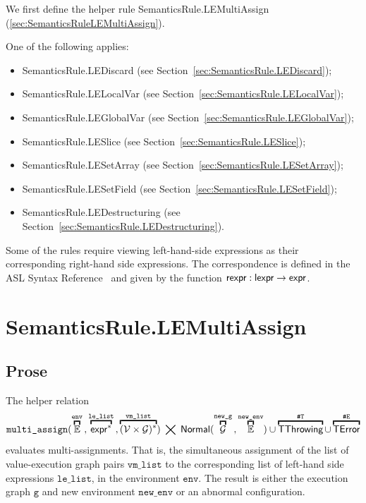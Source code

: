 \documentclass{book}
\newcommand\overname[2]{\overbracket{#1}^{#2}}
\newcommand\XGraphs[0]{\mathcal{G}}
\newcommand\vals[0]{\mathcal{V}}
\newcommand\aslrel[0]{\bigtimes}
\newcommand\aslsep[0]{\mathbf{,}}
\newcommand\ThrowingConfig[0]{\texttt{\#T}}
\newcommand\ErrorConfig[0]{\texttt{\#E}}
\newcommand\TError[0]{\textsf{TError}}
\newcommand\TThrowing[0]{\textsf{TThrowing}}
\newcommand\evalmultiassignment[1]{\texttt{multi\_assign}(#1)}
\newcommand\Normal[0]{\textsf{Normal}}
\newcommand\newenv[0]{\texttt{new\_env}}
\newcommand\env[0]{\texttt{env}}
\newcommand\vg[0]{\texttt{g}}
\newcommand\newg[0]{\texttt{new\_g}}
\newcommand\vlelist[0]{\texttt{le\_list}}
\newcommand\vmlist[0]{\texttt{vm\_list}}
\begin{document}
We first define the helper rule SemanticsRule.LEMultiAssign (\ref{sec:SemanticsRuleLEMultiAssign}).

One of the following applies:
\begin{itemize}
\item SemanticsRule.LEDiscard (see Section~\ref{sec:SemanticsRule.LEDiscard});
\item SemanticsRule.LELocalVar (see Section~\ref{sec:SemanticsRule.LELocalVar});
\item SemanticsRule.LEGlobalVar (see Section~\ref{sec:SemanticsRule.LEGlobalVar});
\item SemanticsRule.LESlice (see Section~\ref{sec:SemanticsRule.LESlice});
\item SemanticsRule.LESetArray (see Section~\ref{sec:SemanticsRule.LESetArray});
\item SemanticsRule.LESetField (see Section~\ref{sec:SemanticsRule.LESetField});
\item SemanticsRule.LEDestructuring (see Section~\ref{sec:SemanticsRule.LEDestructuring}).
\end{itemize}

Some of the rules require viewing left-hand-side expressions as their corresponding right-hand side expressions.
The correspondence is defined in the ASL Syntax Reference~\cite[Chapter 5]{ASLAbstractSyntaxReference}
and given by the function $\textsf{rexpr} : \textsf{lexpr} \rightarrow \textsf{expr}$.

\section{SemanticsRule.LEMultiAssign \label{sec:SemanticsRuleLEMultiAssign}}
\subsection{Prose}
The helper relation
\[
  \evalmultiassignment{\overname{\envs}{\env} \aslsep \overname{\expr^*}{\vlelist} \aslsep \overname{(\vals \times \XGraphs)^*}{\vmlist}} \;\aslrel\;
  \Normal(\overname{\XGraphs}{\newg} \aslsep \overname{\envs}{\newenv}) \cup
  \overname{\TThrowing}{\ThrowingConfig} \cup \overname{\TError}{\ErrorConfig}
\]
evaluates multi-assignments.
That is, the simultaneous assignment of the list of value-execution graph pairs $\vmlist$
to the corresponding list of left-hand side expressions $\vlelist$, in the environment $\env$.
The result is either the execution graph $\vg$ and new environment $\newenv$ or an abnormal configuration.
\end{document}
